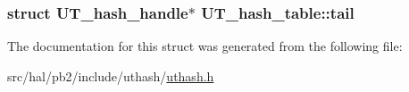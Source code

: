 \subsubsection[{\texorpdfstring{tail}{tail}}]{\setlength{\rightskip}{0pt plus 5cm}struct {\bf U\+T\+\_\+hash\+\_\+handle}$\ast$ U\+T\+\_\+hash\+\_\+table\+::tail}\hypertarget{struct_u_t__hash__table_a00a889a5e1ebaeec0a83ec2701df1992}{}\label{struct_u_t__hash__table_a00a889a5e1ebaeec0a83ec2701df1992}


The documentation for this struct was generated from the following file\+:\begin{DoxyCompactItemize}
\item 
src/hal/pb2/include/uthash/\hyperlink{uthash_8h}{uthash.\+h}\end{DoxyCompactItemize}
